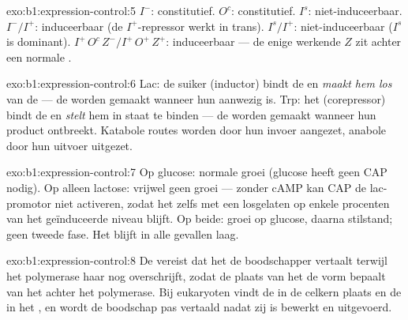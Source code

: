 \begin{solution}{exo:b1:expression-control:5}
$I^-$: constitutief. $O^c$: constitutief. $I^s$: niet-induceerbaar.
$I^-/I^+$: induceerbaar (de $I^+$-repressor werkt in trans). $I^s/I^+$:
niet-induceerbaar ($I^s$ is dominant). $I^+\,O^c\,Z^- / I^+\,O^+\,Z^+$:
induceerbaar --- de enige werkende $Z$ zit achter een normale .
\end{solution}

\begin{solution}{exo:b1:expression-control:6}
Lac: de suiker (inductor) bindt de  en \emph{maakt hem los} van de
 --- de  worden gemaakt wanneer hun  aanwezig is. Trp: het
 (corepressor) bindt de  en \emph{stelt} hem in staat te binden
--- de  worden gemaakt wanneer hun product ontbreekt. Katabole routes worden
door hun invoer aangezet, anabole door hun uitvoer uitgezet.
\end{solution}

\begin{solution}{exo:b1:expression-control:7}
Op glucose: normale groei (glucose heeft geen CAP nodig). Op alleen lactose:
vrijwel geen groei --- zonder cAMP kan CAP de lac-promotor niet activeren, zodat het
 zelfs met een losgelaten  op enkele procenten van het geïnduceerde
niveau blijft. Op beide: groei op glucose, daarna stilstand; geen tweede fase. Het
 blijft in alle gevallen laag.
\end{solution}

\begin{solution}{exo:b1:expression-control:8}
De  vereist dat het  de boodschapper vertaalt terwijl het
polymerase haar nog overschrijft, zodat de plaats van het  de vorm bepaalt
van het  achter het polymerase. Bij eukaryoten vindt de  in de
celkern plaats en de  in het , en wordt de boodschap pas vertaald
nadat zij is bewerkt en uitgevoerd.
\end{solution}


